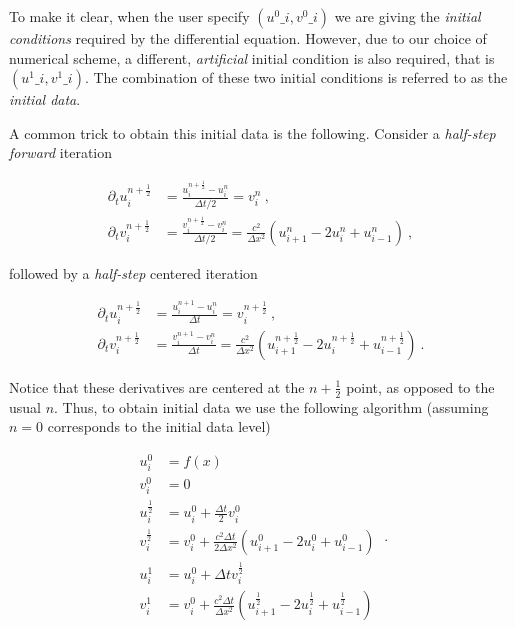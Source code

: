 \documentclass[a4paper,11pt]{article}
\begin{document}
To make it clear, when the user specify $\left(u^{0}\_{i},v^{0}\_{i}\right)$ we are giving the \emph{initial conditions} required by the differential equation. However, due to our choice of numerical scheme, a different, \emph{artificial} initial condition is also required, that is $\left(u^{1}\_{i},v^{1}\_{i}\right)$. The combination of these two initial conditions is referred to as the \emph{initial data}.

A common trick to obtain this initial data is the following. Consider a \emph{half-step forward} iteration

\begin{equation}
\begin{aligned}
\partial_{t}u^{n+\frac{1}{2}}_{i} &= \frac{u^{n+\frac{1}{2}}_{i} - u^{n}_{i}}{\Delta t/2} = v^{n}_{i}\ ,\\
\partial_{t}v^{n+\frac{1}{2}}_{i} &= \frac{v^{n+\frac{1}{2}}_{i} - v^{n}_{i}}{\Delta t/2} = \frac{c^{2}}{\Delta x^{2}}\left(u^{n}_{i+1}-2u^{n}_{i}+u^{n}_{i-1}\right)\ ,
\end{aligned}
\end{equation}

\noindent followed by a \emph{half-step} centered iteration

\begin{equation}
\begin{aligned}
\partial_{t}u^{n+\frac{1}{2}}_{i} &= \frac{u^{n+1}_{i} - u^{n}_{i}}{\Delta t} = v^{n+\frac{1}{2}}_{i}\ ,\\
\partial_{t}v^{n+\frac{1}{2}}_{i} &= \frac{v^{n+1}_{i} - v^{n}_{i}}{\Delta t} = \frac{c^{2}}{\Delta x^{2}}\left(u^{n+\frac{1}{2}}_{i+1}-2u^{n+\frac{1}{2}}_{i}+u^{n+\frac{1}{2}}_{i-1}\right)\ .
\end{aligned}
\end{equation}

\noindent Notice that these derivatives are centered at the $n+\frac{1}{2}$ point, as opposed to the usual $n$. Thus, to obtain initial data we use the following algorithm (assuming $n=0$ corresponds to the initial data level)

\begin{equation}
\boxed{
\begin{aligned}
u_{i}^{0} &= f(x)\\
v_{i}^{0} &= 0\\
u^{\frac{1}{2}}_{i} &= u^{0}_{i} + \frac{\Delta t}{2}v^{0}_{i}\\
v^{\frac{1}{2}}_{i} &= v^{0}_{i} + \frac{c^{2}\Delta t}{2\Delta x^{2}}\left(u^{0}_{i+1}-2u^{0}_{i}+u^{0}_{i-1}\right)\\
u^{1}_{i} &= u^{0}_{i} + \Delta t v^{\frac{1}{2}}_{i}\\
v^{1}_{i} &= v^{0}_{i} + \frac{c^{2}\Delta t}{\Delta x^{2}}\left(u^{\frac{1}{2}}_{i+1}-2u^{\frac{1}{2}}_{i}+u^{\frac{1}{2}}_{i-1}\right)
\end{aligned}
}\ .
\end{equation}
\end{document}
